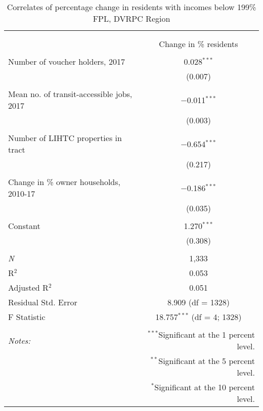 \documentclass[paper=letterpaper, fontsize=11pt]{scrartcl}
\begin{document}
\begin{table}[!htbp] \centering 
	\caption{Correlates of percentage change in residents with incomes below 199\% FPL, DVRPC Region} 
		\label{} 
		\begin{tabular}{@{\extracolsep{5pt}}lc} 
			\\[-1.8ex]\hline 
			\hline \\[-1.8ex] 
			\\[-1.8ex] & Change in \% residents \\ 
			\hline \\[-1.8ex] 
			Number of voucher holders, 2017 & 0.028$^{***}$ \\ 
			& (0.007) \\ 
			& \\ 
			Mean no. of transit-accessible jobs, 2017 & $-$0.011$^{***}$ \\ 
			& (0.003) \\ 
			& \\ 
			Number of LIHTC properties in tract & $-$0.654$^{***}$ \\ 
			& (0.217) \\ 
			& \\ 
			Change in \% owner households, 2010-17 & $-$0.186$^{***}$ \\ 
			& (0.035) \\ 
			& \\ 
			Constant & 1.270$^{***}$ \\ 
			& (0.308) \\ 
			& \\ 
			\textit{N} & 1,333 \\ 
			R$^{2}$ & 0.053 \\ 
			Adjusted R$^{2}$ & 0.051 \\ 
			Residual Std. Error & 8.909 (df = 1328) \\ 
			F Statistic & 18.757$^{***}$ (df = 4; 1328) \\ 
			\hline 
			\hline \\[-1.8ex] 
			\textit{Notes:} & \multicolumn{1}{r}{$^{***}$Significant at the 1 percent level.} \\ 
			& \multicolumn{1}{r}{$^{**}$Significant at the 5 percent level.} \\ 
			& \multicolumn{1}{r}{$^{*}$Significant at the 10 percent level.} \\ 
		\end{tabular} 
	\end{table} 
\end{document}
